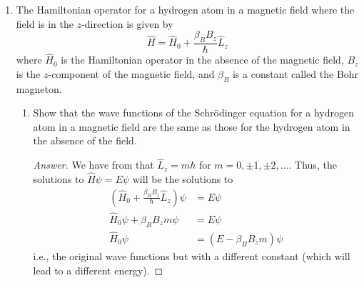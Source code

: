 \documentclass[../psets.tex]{subfiles}
\begin{document}
\begin{enumerate}
\begin{proof}[Answer]
\begin{align*}
        \end{align*}
        Thus, since
        \begin{align*}
            \mu_{\ce{H}} &= \frac{m_em_p}{m_e+m_p}&
                \mu_{\ce{T}} &= \frac{m_e(3m_p)}{m_3+3m_p}\\
            &= \SI{9.11e-31}{\kilo\gram}&
                &= \SI{9.12e-31}{\kilo\gram}
        \end{align*}
        Therefore, we have that
        \begin{align*}
            \frac{E_{1_{\ce{H}}}}{E_{1_{\ce{T}}}} &= \frac{-\frac{\mu_{\ce{H}}e^4}{8h^2\epsilon_0^2}}{-\frac{\mu_{\ce{T}}e^4}{8h^2\epsilon_0^2}}\\
            &= \frac{\mu_{\ce{H}}}{\mu_{\ce{T}}}\\
            \Aboxed{E_{1_{\ce{H}}}:E_{1_{\ce{T}}} &= 0.999}
        \end{align*}
    \end{proof}
    \item The Hamiltonian operator for a hydrogen atom in a magnetic field where the field is in the $z$-direction is given by
    \begin{equation*}
        \hat{H} = \hat{H}_0+\frac{\beta_BB_z}{\hbar}\hat{L}_z
    \end{equation*}
    where $\hat{H}_0$ is the Hamiltonian operator in the absence of the magnetic field, $B_z$ is the $z$-component of the magnetic field, and $\beta_B$ is a constant called the Bohr magneton.
    \begin{enumerate}
        \item Show that the wave functions of the Schr\"{o}dinger equation for a hydrogen atom in a magnetic field are the same as those for the hydrogen atom in the absence of the field.
        \begin{proof}[Answer]
            We have from \textcite[201]{bib:McQuarrieSimon} that $\hat{L}_z=m\hbar$ for $m=0,\pm 1,\pm 2,\dots$. Thus, the solutions to $\hat{H}\psi=E\psi$ will be the solutions to
            \begin{align*}
                \left( \hat{H}_0+\frac{\beta_BB_z}{\hbar}\hat{L}_z \right)\psi &= E\psi\\
                \hat{H}_0\psi+\beta_BB_zm\psi &= E\psi\\
                \hat{H}_0\psi &= (E-\beta_BB_zm)\psi
            \end{align*}
            i.e., the original wave functions but with a different constant (which will lead to a different energy).

\end{proof}
\end{enumerate}
\end{enumerate}
\end{document}
